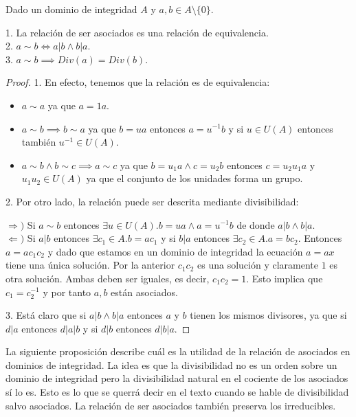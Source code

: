 \begin{proposition}\label{div-1}
Dado un dominio de integridad $A$ y $a,b \in A \setminus \{0\}$. 

1. La relación de ser asociados es una relación de equivalencia. \\
2. $a \sim b \iff a|b \land b|a$.\\
3. $a \sim b \implies Div(a) = Div(b)$.  
\end{proposition}
\begin{proof}
1. En efecto, tenemos que la relación es de equivalencia:

\begin{itemize}
\item $a \sim a$ ya que $a = 1a$.
\item $a \sim b \implies b \sim a$ ya que $b = ua$ entonces $a = u^{-1}b$ y si $u \in U(A)$ entonces también $u^{-1} \in U(A)$. 
\item $a \sim b \land b \sim c \implies a \sim c$ ya que $b = u_1a \land c = u_2b$ entonces $c = u_2 u_1 a$ y $u_1u_2 \in U(A)$ ya que el conjunto de los unidades forma un grupo.  
\end{itemize}

2. Por otro lado, la relación puede ser descrita mediante divisibilidad:

$\Rightarrow)$ Si $a \sim b$ entonces $\exists u \in U(A). b = ua \land a = u^{-1}b$ de donde $a | b \land b | a$. \\
$\Leftarrow)$ Si $a | b$ entonces $\exists c_1 \in A. b = ac_1$ y si $b | a$ entonces $\exists c_2 \in A. a = bc_2$. Entonces $a = a c_1c_2$ y dado que estamos en un dominio de integridad la ecuación $a = ax$ tiene una única solución. Por la anterior $c_1c_2$ es una solución y claramente $1$ es otra solución. Ambas deben ser iguales, es decir, $c_1c_2 = 1$. Esto implica que $c_1 = c_2^{-1}$ y por tanto $a,b$ están asociados.  

3. Está claro que si $a|b \land b|a$ entonces $a$ y $b$ tienen los mismos divisores, ya que si $d|a$ entonces $d|a|b$ y si $d|b$ entonces $d|b|a$. 
\end{proof}

La siguiente proposición describe cuál es la utilidad de la relación de asociados en dominios de integridad. La idea es que la divisibilidad no es un orden sobre un dominio de integridad pero la divisibilidad natural en el cociente de los asociados sí lo es. Esto es lo que se querrá decir en el texto cuando se hable de divisibilidad salvo asociados. La relación de ser asociados también preserva los irreducibles.

